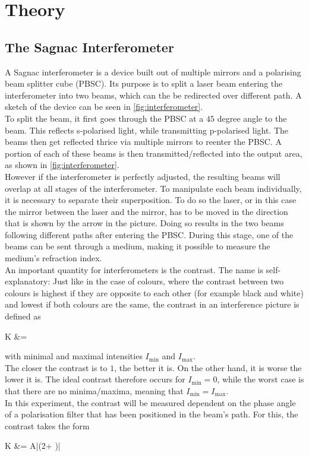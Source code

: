 \section{Theory}
\label{sec:Theory}
\subsection{The Sagnac Interferometer}
\label{sec:The_Sagnac_Interferometer}
A Sagnac interferometer is a device built out of multiple mirrors and a polarising beam splitter cube (PBSC). Its purpose is to split a laser beam entering the interferometer into two beams, which can the be redirected over different path. A sketch of the device can be seen in \autoref{fig:interferometer}.\\
To split the beam, it first goes through the PBSC at a $45$ degree angle to the beam. This reflects s-polarised light, while transmitting p-polarised light. The beams then get reflected thrice via multiple mirrors to reenter the PBSC. A portion of each of these beams is then transmitted/reflected into the output area, as shown in \autoref{fig:interferometer}.\\
However if the interferometer is perfectly adjusted, the resulting beams will overlap at all stages of the interferometer. To manipulate each beam individually, it is necessary to separate their superposition. To do so the laser, or in this case the mirror between the laser and the mirror, has to be moved in the direction that is shown by the arrow in the picture. Doing so results in the two beams following different paths after entering the PBSC. During this stage, one of the beams can be sent through a medium, making it possible to measure the medium's refraction index.
\\
An important quantity for interferometers is the contrast. The name is self-explanatory: Just like in the case of colours, where the contrast between two colours is highest if they are opposite to each other (for example black and white) and lowest if both colours are the same, the contrast in an interference picture is defined as 
\begin{aquation}
  K &=  \tc
  \label{eq:contrast}
\end{aquation}
with minimal and maximal intensities $I_\text{min}$ and $I_\text{max}$.\\
The closer the contrast is to $1$, the better it is. On the other hand, it is worse the lower it is. The ideal contrast therefore occurs for $I_\text{min}=0$, while the worst case is that there are no minima/maxima, meaning that $I_\text{min}=I_\text{max}$.\\
In this experiment, the contrast will be measured dependent on the phase angle of a polarisation filter that has been positioned in the beam's path. For this, the contrast takes the form 
\begin{aquation}
K &= A|\sin(2\varphi + \delta)| \tp
\end{aquation}

